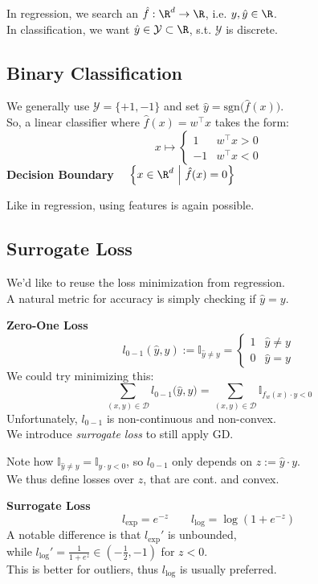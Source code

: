 In regression, we search an $\hat{f}: \R^d \to \R$, i.e. $y,\hat{y} \in \R$.\\
In classification, we want $\hat{y} \in \mathcal{Y} \subset \R$, s.t. $\mathcal{Y}$ is discrete.

\subsection{Binary Classification}

We generally use $\mathcal{Y} = \{+1,-1\}$ and set $\hat{y} = \text{sgn}\bigl(\hat{f}(x)\bigr)$.\\
So, a linear classifier where $\hat{f}(x) = w^\top x$ takes the form:
$$
    x \mapsto \begin{cases}
        1   & w^\top x > 0 \\
        -1  & w^\top x < 0
    \end{cases}
$$
 \textbf{Decision Boundary} $\quad \Bigl\{ x \in \R^d \ \Big|\ \hat{f}(x) = 0 \Bigr\}$

Like in regression, using features is again possible.

\subsection{Surrogate Loss}

We'd like to reuse the loss minimization from regression.\\
A natural metric for accuracy is simply checking if $\hat{y} = y$.

 \textbf{Zero-One Loss}
$$
    l_{0-1}(\hat{y},y) := \mathbb{I}_{\hat{y}\neq y} = \begin{cases}
        1 & \hat{y} \neq y \\
        0 & \hat{y} = y
    \end{cases}
$$
We could try minimizing this:
$$
    \underset{(x,y) \in \mathcal{D}}{\sum} l_{0-1}\bigl( \hat{y},y \bigr) = \underset{(x,y) \in \mathcal{D}}{\sum} \mathbb{I}_{f_w(x) \cdot y < 0}
$$
Unfortunately, $l_{0-1}$ is non-continuous and non-convex.\\
We introduce \textit{surrogate loss} to still apply GD.

Note how $\mathbb{I}_{\hat{y}\neq y} = \mathbb{I}_{\hat{y}\cdot y < 0}$, so $l_{0-1}$ only depends on $z := \hat{y}\cdot y$.\\
We thus define losses over $z$, that are cont. and convex.

 \textbf{Surrogate Loss}
$$
    l_\text{exp} = e^{-z} \qquad l_\text{log} = \log(1+e^{-z})
$$
A notable difference is that $l_\text{exp}'$ is unbounded,\\
while $l_\text{log}' = \frac{1}{1+e^z} \in (-\frac{1}{2}, -1)$ for $z < 0$.\\
This is better for outliers, thus $l_\text{log}$ is usually preferred.

